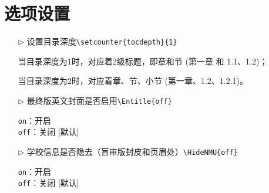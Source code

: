 \section{选项设置}

\begin{itemize}
	\item[$\triangleright$] 设置目录深度\verb|\setcounter{tocdepth}{1}|
	
	当目录深度为1时，对应着2级标题，即章和节 (第一章 和 1.1、1.2)；
	
	当目录深度为2时，对应着章、节、小节 (第一章、1.2、1.2.1)。
	
	\item[$\triangleright$] 最终版英文封面是否启用\verb|\Entitle{off}|
	
	\texttt{on}：开启 \\
	\texttt{off}：关闭 [默认]
	
	\item[$\triangleright$] 学校信息是否隐去（盲审版封皮和页眉处）\verb|\HideNMU{off}|
		
	\texttt{on}：开启 \\
	\texttt{off}：关闭 [默认]
\end{itemize}


